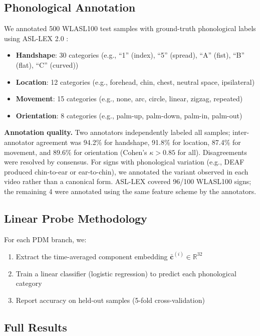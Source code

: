 \documentclass[sigconf,nonacm,anonymous]{acmart}
\theoremstyle{definition}
\theoremstyle{remark}
\begin{document}
\subsection{Phonological Annotation}

We annotated 500 WLASL100 test samples with ground-truth phonological labels using ASL-LEX 2.0 \cite{caselli2017asl}:
\begin{itemize}[nosep,topsep=2pt,leftmargin=*]
\item \textbf{Handshape}: 30 categories (e.g., ``1'' (index), ``5'' (spread), ``A'' (fist), ``B'' (flat), ``C'' (curved))
\item \textbf{Location}: 12 categories (e.g., forehead, chin, chest, neutral space, ipsilateral)
\item \textbf{Movement}: 15 categories (e.g., none, arc, circle, linear, zigzag, repeated)
\item \textbf{Orientation}: 8 categories (e.g., palm-up, palm-down, palm-in, palm-out)
\end{itemize}

\textbf{Annotation quality.} Two annotators independently labeled all samples; inter-annotator agreement was 94.2\% for handshape, 91.8\% for location, 87.4\% for movement, and 89.6\% for orientation (Cohen's $\kappa > 0.85$ for all). Disagreements were resolved by consensus. For signs with phonological variation (e.g., DEAF produced chin-to-ear or ear-to-chin), we annotated the variant observed in each video rather than a canonical form. ASL-LEX covered 96/100 WLASL100 signs; the remaining 4 were annotated using the same feature scheme by the annotators.

\subsection{Linear Probe Methodology}

For each PDM branch, we:
\begin{enumerate}[nosep,topsep=2pt]
\item Extract the time-averaged component embedding $\bar{\mathbf{c}}^{(i)} \in \mathbb{R}^{32}$
\item Train a linear classifier (logistic regression) to predict each phonological category
\item Report accuracy on held-out samples (5-fold cross-validation)
\end{enumerate}

\subsection{Full Results}
\end{document}
